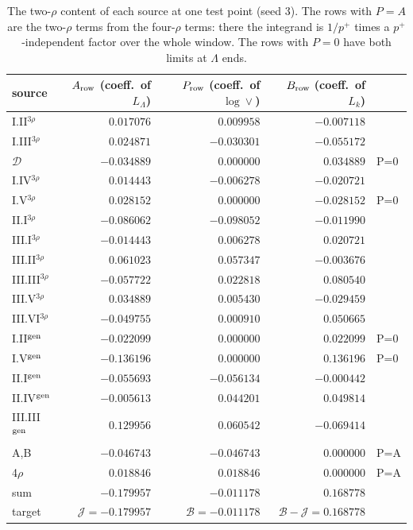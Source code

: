 \documentclass[10pt]{article}
\numberwithin{equation}{section}
\newcommand{\LL}{L_\Lambda}
\newcommand{\Lk}{L_k}
\begin{document}
\begin{table}[H]
\centering\small
\begin{tabular}{@{}l r r r l@{}}
source & $A_{\rm row}$ (coeff.\ of $\LL$) & $P_{\rm row}$ (coeff.\ of $\log\vee$) & $B_{\rm row}$ (coeff.\ of $\Lk$) & \\ \hline
I.II$^{3\rho}$ & $0.017076$ & $0.009958$ & $-0.007118$ & \\
I.III$^{3\rho}$ & $0.024871$ & $-0.030301$ & $-0.055172$ & \\
$\mathcal D$ & $-0.034889$ & $0.000000$ & $0.034889$ & P=0\\
I.IV$^{3\rho}$ & $0.014443$ & $-0.006278$ & $-0.020721$ & \\
I.V$^{3\rho}$ & $0.028152$ & $0.000000$ & $-0.028152$ & P=0\\
II.I$^{3\rho}$ & $-0.086062$ & $-0.098052$ & $-0.011990$ & \\
III.I$^{3\rho}$ & $-0.014443$ & $0.006278$ & $0.020721$ & \\
III.II$^{3\rho}$ & $0.061023$ & $0.057347$ & $-0.003676$ & \\
III.III$^{3\rho}$ & $-0.057722$ & $0.022818$ & $0.080540$ & \\
III.V$^{3\rho}$ & $0.034889$ & $0.005430$ & $-0.029459$ & \\
III.VI$^{3\rho}$ & $-0.049755$ & $0.000910$ & $0.050665$ & \\
I.II$^{\rm gen}$ & $-0.022099$ & $0.000000$ & $0.022099$ & P=0\\
I.V$^{\rm gen}$ & $-0.136196$ & $0.000000$ & $0.136196$ & P=0\\
II.I$^{\rm gen}$ & $-0.055693$ & $-0.056134$ & $-0.000442$ & \\
II.IV$^{\rm gen}$ & $-0.005613$ & $0.044201$ & $0.049814$ & \\
III.III$^{\rm gen}$ & $0.129956$ & $0.060542$ & $-0.069414$ & \\
A,B & $-0.046743$ & $-0.046743$ & $0.000000$ & P=A\\
4$\rho$ & $0.018846$ & $0.018846$ & $0.000000$ & P=A\\
\hline sum & $-0.179957$ & $-0.011178$ & $0.168778$ & \\
target & $\mathcal J=-0.179957$ & $\mathcal B=-0.011178$ & $\mathcal B-\mathcal J=0.168778$ & \\
\end{tabular}
\caption{The two-$\rho$ content of each source at one test point (seed 3). The rows with $P=A$ are the two-$\rho$ terms from the four-$\rho$ terms: there the integrand is $1/p^+$ times a $p^+$-independent factor over the whole window. The rows with $P=0$ have both limits at $\Lambda$ ends.}
\label{tab:rowvalues}
\end{table}
\end{document}
